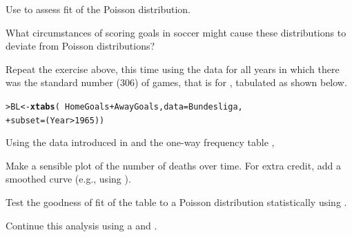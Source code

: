 \documentclass[11pt]{report}\usepackage[]{graphicx}\usepackage[]{color}
\makeatletter
\newcommand{\hlnum}[1]{\textcolor[rgb]{0.686,0.059,0.569}{#1}}%
\newcommand{\hlopt}[1]{\textcolor[rgb]{0,0,0}{#1}}%
\newcommand{\hlstd}[1]{\textcolor[rgb]{0.345,0.345,0.345}{#1}}%
\newcommand{\hlkwb}[1]{\textcolor[rgb]{0.69,0.353,0.396}{#1}}%
\newcommand{\hlkwc}[1]{\textcolor[rgb]{0.333,0.667,0.333}{#1}}%
\newcommand{\hlkwd}[1]{\textcolor[rgb]{0.737,0.353,0.396}{\textbf{#1}}}%
\newenvironment{kframe}{%
 \def\at@end@of@kframe{}%
 \ifinner\ifhmode%
  \def\at@end@of@kframe{\end{minipage}}%
  \begin{minipage}{\columnwidth}%
 \fi\fi%
 \def\FrameCommand##1{\hskip\@totalleftmargin \hskip-\fboxsep
 \colorbox{shadecolor}{##1}\hskip-\fboxsep
     \hskip-\linewidth \hskip-\@totalleftmargin \hskip\columnwidth}%
 \MakeFramed {\advance\hsize-\width
   \@totalleftmargin\z@ \linewidth\hsize
   \@setminipage}}%
 {\par\unskip\endMakeFramed%
 \at@end@of@kframe}
\newenvironment{knitrout}{}{} %
\renewenvironment{knitrout}{\small\renewcommand{\baselinestretch}{.85}}{} %
\makeatother
\begin{document}
\begin{Exercises}
\begin{enumerate*}
    \item Use  to assess fit of the Poisson distribution.
    \begin{ans}
    \end{ans}
    
    \item What circumstances of scoring goals in soccer might cause these distributions to
    deviate from Poisson distributions?
    \begin{ans}
    \end{ans}
    
  \end{enumerate*}

  \exercise\exhard
  Repeat the exercise above, this time using the data for all years in which there was
  the standard number (306) of games, that is for , tabulated as shown below.
\begin{knitrout}
\color{fgcolor}\begin{kframe}
\begin{alltt}
\hlstd{> }\hlstd{BL} \hlkwb{<-} \hlkwd{xtabs}\hlstd{(}\hlopt{~} \hlstd{HomeGoals} \hlopt{+} \hlstd{AwayGoals,} \hlkwc{data} \hlstd{= Bundesliga,}
\hlstd{+ }            \hlkwc{subset} \hlstd{= (Year} \hlopt{>} \hlnum{1965}\hlstd{))}
\end{alltt}
\end{kframe}
\end{knitrout}



\exercise Using the data  introduced in 
and the one-way frequency table , %
  \begin{enumerate*}
    \item Make a sensible plot of the number of deaths over time. For extra credit,
    add a smoothed curve (e.g., using ).
    \begin{ans}
    \end{ans}
    
    \item Test the goodness of fit of the table  to
    a Poisson distribution statistically using .
    \begin{ans}
    \end{ans}
    
    \item Continue this analysis using a  and .
    \begin{ans}
    \end{ans}
    

\end{enumerate*}
\end{Exercises}
\end{document}
